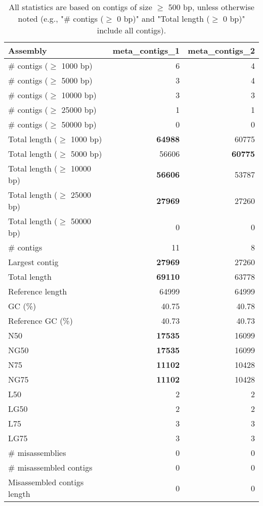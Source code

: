 \documentclass[12pt,a4paper]{article}
\begin{document}
\begin{table}[ht]
\begin{center}
\caption{All statistics are based on contigs of size $\geq$ 500 bp, unless otherwise noted (e.g., "\# contigs ($\geq$ 0 bp)" and "Total length ($\geq$ 0 bp)" include all contigs).}
\begin{tabular}{|l*{2}{|r}|}
\hline
Assembly & meta\_contigs\_1 & meta\_contigs\_2 \\ \hline
\# contigs ($\geq$ 1000 bp) & 6 & 4 \\ \hline
\# contigs ($\geq$ 5000 bp) & 3 & 4 \\ \hline
\# contigs ($\geq$ 10000 bp) & 3 & 3 \\ \hline
\# contigs ($\geq$ 25000 bp) & 1 & 1 \\ \hline
\# contigs ($\geq$ 50000 bp) & 0 & 0 \\ \hline
Total length ($\geq$ 1000 bp) & {\bf 64988} & 60775 \\ \hline
Total length ($\geq$ 5000 bp) & 56606 & {\bf 60775} \\ \hline
Total length ($\geq$ 10000 bp) & {\bf 56606} & 53787 \\ \hline
Total length ($\geq$ 25000 bp) & {\bf 27969} & 27260 \\ \hline
Total length ($\geq$ 50000 bp) & 0 & 0 \\ \hline
\# contigs & 11 & 8 \\ \hline
Largest contig & {\bf 27969} & 27260 \\ \hline
Total length & {\bf 69110} & 63778 \\ \hline
Reference length & 64999 & 64999 \\ \hline
GC (\%) & 40.75 & 40.78 \\ \hline
Reference GC (\%) & 40.73 & 40.73 \\ \hline
N50 & {\bf 17535} & 16099 \\ \hline
NG50 & {\bf 17535} & 16099 \\ \hline
N75 & {\bf 11102} & 10428 \\ \hline
NG75 & {\bf 11102} & 10428 \\ \hline
L50 & 2 & 2 \\ \hline
LG50 & 2 & 2 \\ \hline
L75 & 3 & 3 \\ \hline
LG75 & 3 & 3 \\ \hline
\# misassemblies & 0 & 0 \\ \hline
\# misassembled contigs & 0 & 0 \\ \hline
Misassembled contigs length & 0 & 0 \\ \hline

\end{tabular}
\end{center}
\end{table}
\end{document}
